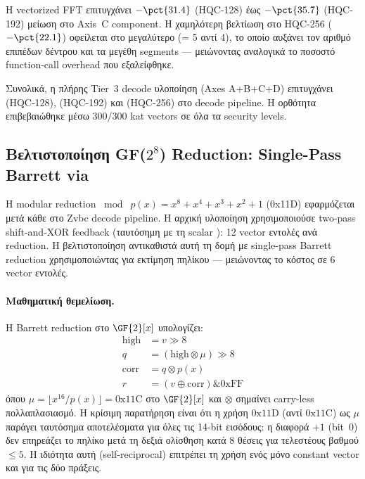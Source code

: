 \begin{table}[htbp]
  \centering
  \caption{Απομονωμένη συνεισφορά Axis~C (FFT root-finding): σύγκριση
           \Zvbc pipeline με scalar FFT έναντι vectorized FFT.}
  \label{tab:decode-axisc}
  
\end{table}

Η vectorized FFT επιτυγχάνει $-\pct{31.4}$ (HQC-128) έως $-\pct{35.7}$
(HQC-192) μείωση στο Axis~C component.  Η χαμηλότερη βελτίωση στο HQC-256
($-\pct{22.1}$) οφείλεται στο μεγαλύτερο  (= 5 αντί 4),
το οποίο αυξάνει τον αριθμό επιπέδων δέντρου και τα μεγέθη segments —
μειώνοντας αναλογικά το ποσοστό function-call overhead που εξαλείφθηκε.

Συνολικά, η πλήρης Tier~3 decode υλοποίηση (Axes A+B+C+D) επιτυγχάνει
 (HQC-128),  (HQC-192) και 
(HQC-256) στο decode pipeline.  Η ορθότητα επιβεβαιώθηκε μέσω
\num{300}/\num{300} \gls{kat} vectors σε όλα τα security levels.

\subsection{Βελτιστοποίηση GF($2^8$) Reduction: Single-Pass Barrett via }
\label{sec:decode-barrett}

Η modular reduction $\bmod\; p(x) = x^8 + x^4 + x^3 + x^2 + 1$ (0x11D)
εφαρμόζεται μετά κάθε  στο Zvbc decode pipeline.  Η αρχική
υλοποίηση χρησιμοποιούσε two-pass shift-and-XOR feedback (ταυτόσημη με τη
scalar ): \num{12} vector εντολές ανά reduction.  Η
βελτιστοποίηση αντικαθιστά αυτή τη δομή με single-pass Barrett reduction
χρησιμοποιώντας  για εκτίμηση πηλίκου — μειώνοντας το
κόστος σε \num{6} vector εντολές.

\paragraph{Μαθηματική θεμελίωση.}
Η Barrett reduction στο $\GF{2}[x]$ υπολογίζει:
\begin{align}
  \text{high} &= v \gg 8 \label{eq:barrett-high} \\
  q &= (\text{high} \otimes \mu) \gg 8 \label{eq:barrett-q} \\
  \text{corr} &= q \otimes p(x) \label{eq:barrett-corr} \\
  r &= (v \oplus \text{corr}) \mathbin{\&} \text{0xFF} \label{eq:barrett-r}
\end{align}
%
όπου $\mu = \lfloor x^{16} / p(x) \rfloor = \text{0x11C}$ στο $\GF{2}[x]$
και $\otimes$ σημαίνει carry-less πολλαπλασιασμό.  Η κρίσιμη παρατήρηση
είναι ότι η χρήση $\text{0x11D}$ (αντί $\text{0x11C}$) ως $\mu$ παράγει
ταυτόσημα αποτελέσματα για όλες τις 14-bit εισόδους: η διαφορά $+1$ (bit~0)
δεν επηρεάζει το πηλίκο μετά τη δεξιά ολίσθηση κατά \num{8} θέσεις για
τελεστέους βαθμού $\leq 5$.  Η ιδιότητα αυτή (self-reciprocal) επιτρέπει
τη χρήση ενός μόνο constant vector και για τις δύο  πράξεις.


